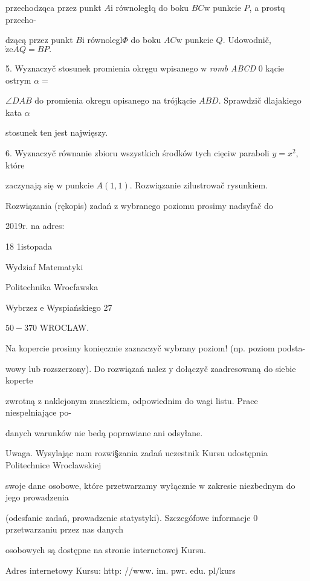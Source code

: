 \documentclass[a4paper,12pt]{article}
\begin{document}
przechodzqca przez punkt $A\mathrm{i}$ równoległq do boku $BC\mathrm{w}$ punkcie $P$, a prostq przecho-

dzącą przez punkt $B\mathrm{i}$ równolegl$\Phi$ do boku $AC\mathrm{w}$ punkcie $Q$. Udowodnič, $\dot{\mathrm{z}}\mathrm{e}AQ=BP.$

5. Wyznaczyč stosunek promienia okręgu wpisanego $\mathrm{w}$ {\it romb ABCD} $0$ kącie ostrym $\alpha=$

$\angle DAB$ do promienia okregu opisanego na trójkącie $ABD$. Sprawdzič dlajakiego kata $\alpha$

stosunek ten jest najwięszy.

6. Wyznaczyč równanie zbioru wszystkich środków tych cięciw paraboli $y = x^{2}$, które

zaczynają się $\mathrm{w}$ punkcie $A(1,1)$. Rozwiązanie zilustrowač rysunkiem.

Rozwiązania (rękopis) zadań z wybranego poziomu prosimy nadsyfač do

2019r. na adres:

18 1istopada

Wydziaf Matematyki

Politechnika Wrocfawska

Wybrzez $\mathrm{e}$ Wyspiańskiego 27

$50-370$ WROCLAW.

Na kopercie prosimy $\underline{\mathrm{k}\mathrm{o}\mathrm{n}\mathrm{i}\mathrm{e}\mathrm{c}\mathrm{z}\mathrm{n}\mathrm{i}\mathrm{e}}$ zaznaczyč wybrany poziom! (np. poziom podsta-

wowy lub rozszerzony). Do rozwiązań nalez $\mathrm{y}$ dołączyč zaadresowaną do siebie koperte

zwrotną $\mathrm{z}$ naklejonym znaczkiem, odpowiednim do wagi listu. Prace niespelniające po-

danych warunków nie bedą poprawiane ani odsyłane.

Uwaga. Wysylając nam rozwi\S zania zadań uczestnik Kursu udostępnia Politechnice Wroclawskiej

swoje dane osobowe, które przetwarzamy wyłącznie $\mathrm{w}$ zakresie niezbednym do jego prowadzenia

(odesfanie zadań, prowadzenie statystyki). Szczegófowe informacje $0$ przetwarzaniu przez nas danych

osobowych są dostępne na stronie internetowej Kursu.

Adres internetowy Kursu: http: //www. im. pwr. edu. pl/kurs
\end{document}

